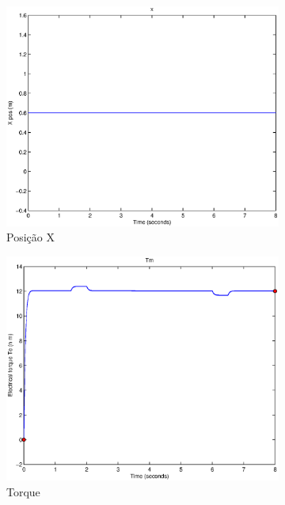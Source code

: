 \documentclass{article}
\begin{document}
\begin{figure}[H]
\begin{subfigure}{0.45\textwidth}
		\includegraphics[width=\linewidth]{matlab/x8}
		\caption{Posição X}
	\end{subfigure}
	\begin{subfigure}{0.45\textwidth}
		\includegraphics[width=\linewidth]{matlab/tm8}
		\caption{Torque}
	\end{subfigure}
	\begin{subfigure}{0.45\textwidth}

\end{subfigure}
\end{figure}
\end{document}
